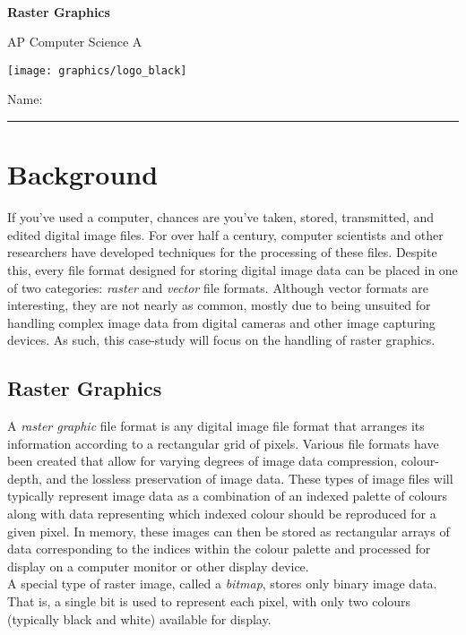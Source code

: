 

\def\LabCourse{AP Computer Science A}
\def\LabNumber{09}
\def\LabTitle{Raster Graphics}


	\begin{coverpages}
		\ \\[2cm]
		\begin{center}
			\huge
			\textbf{\LabTitle}

			\Large
			\LabCourse
		\end{center}

		\vspace{1.5cm}

		\begin{center}
			\texttt{[image: graphics/logo\_black]}

			\vspace{2.5cm}

			\Large
			Name: \rule{11.5cm}{0.1pt}
		\end{center}
	\end{coverpages}

	\blankpage

	\thispagestyle{empty}
	\tableofcontents

	\pagebreak

  \section{Background}
    If you've used a computer, chances are you've taken, stored, transmitted, and edited digital image files. For over half a century, computer scientists and other researchers have developed techniques for the processing of these files. Despite this, every file format designed for storing digital image data can be placed in one of two categories: \emph{raster} and \emph{vector} file formats. Although vector formats are interesting, they are not nearly as common, mostly due to being unsuited for handling complex image data from digital cameras and other image capturing devices. As such, this case-study will focus on the handling of raster graphics.

    \subsection{Raster Graphics}
      A \emph{raster graphic} file format is any digital image file format that arranges its information according to a rectangular grid of pixels. Various file formats have been created that allow for varying degrees of image data compression, colour-depth, and the lossless preservation of image data. These types of image files will typically represent image data as a combination of an indexed palette of colours along with data representing which indexed colour should be reproduced for a given pixel. In memory, these images can then be stored as rectangular arrays of data corresponding to the indices within the colour palette and processed for display on a computer monitor or other display device.\\[\baselineskip]
      A special type of raster image, called a \emph{bitmap}, stores only binary image data. That is, a single bit is used to represent each pixel, with only two colours (typically black and white) available for display.
